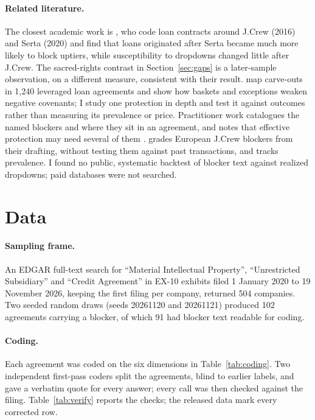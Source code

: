\documentclass[12pt]{article}
\begin{document}
\paragraph{Related literature.} The closest academic work is \citet{BuccolaNini2024}, who code loan contracts around J.Crew (2016) and Serta (2020) and find that loans originated after Serta became much more likely to block uptiers, while susceptibility to dropdowns changed little after J.Crew. The sacred-rights contrast in Section~\ref{sec:gaps} is a later-sample observation, on a different measure, consistent with their result. \citet{IvashinaVallee2025} map carve-outs in 1,240 leveraged loan agreements and show how baskets and exceptions weaken negative covenants; I study one protection in depth and test it against outcomes rather than measuring its prevalence or price. Practitioner work catalogues the named blockers and where they sit in an agreement, and notes that effective protection may need several of them \citep{Cleary2025}. \citet{Octus2025} grades European J.Crew blockers from their drafting, without testing them against past transactions, and \citet{Noetica2026} tracks prevalence. I found no public, systematic backtest of blocker text against realized dropdowns; paid databases were not searched.

\section{Data}\label{sec:data}
\paragraph{Sampling frame.} An EDGAR full-text search for ``Material Intellectual Property'', ``Unrestricted Subsidiary'' and ``Credit Agreement'' in EX-10 exhibits filed 1 January 2020 to 19 November 2026, keeping the first filing per company, returned 504 companies. Two seeded random draws (seeds 20261120 and 20261121) produced 102 agreements carrying a blocker, of which 91 had blocker text readable for coding.

\paragraph{Coding.} Each agreement was coded on the six dimensions in Table~\ref{tab:coding}. Two independent first-pass coders split the agreements, blind to earlier labels, and gave a verbatim quote for every answer; every call was then checked against the filing. Table~\ref{tab:verify} reports the checks; the released data mark every corrected row.
\end{document}
